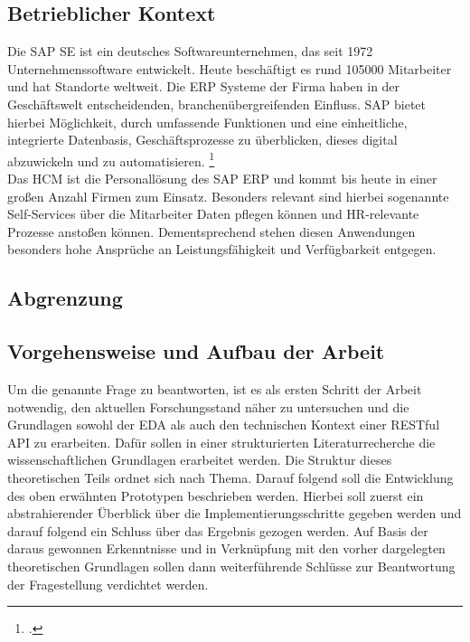 \subsection{Betrieblicher Kontext}
Die SAP SE ist ein deutsches Softwareunternehmen, das seit 1972 Unternehmenssoftware entwickelt. Heute beschäftigt es rund 105000 Mitarbeiter und hat Standorte weltweit. Die \ac{ERP} Systeme der Firma haben in der Geschäftswelt entscheidenden, branchenübergreifenden Einfluss. SAP bietet hierbei Möglichkeit, durch umfassende Funktionen und eine einheitliche, integrierte Datenbasis, Geschäftsprozesse zu überblicken, dieses digital abzuwickeln und zu automatisieren. \footcite[Vgl.][]{sapse_was} \\
Das HCM ist die Personallösung des SAP ERP und kommt bis heute in einer großen Anzahl Firmen zum Einsatz. Besonders relevant sind hierbei sogenannte Self-Services über die Mitarbeiter Daten pflegen können und HR-relevante Prozesse anstoßen können. Dementsprechend stehen diesen Anwendungen besonders hohe Ansprüche an Leistungsfähigkeit und Verfügbarkeit entgegen.

\subsection{Abgrenzung}

\subsection{Vorgehensweise und Aufbau der Arbeit}
Um die genannte Frage zu beantworten, ist es als ersten Schritt der Arbeit notwendig, den aktuellen Forschungsstand näher zu untersuchen und die Grundlagen sowohl der \ac{EDA} als auch den technischen Kontext einer RESTful API zu erarbeiten. Dafür sollen in einer strukturierten Literaturrecherche die wissenschaftlichen Grundlagen erarbeitet werden. Die Struktur dieses theoretischen Teils ordnet sich nach Thema. Darauf folgend soll die Entwicklung des oben erwähnten Prototypen beschrieben werden. Hierbei soll zuerst ein abstrahierender Überblick über die Implementierungsschritte gegeben werden und darauf folgend ein Schluss über das Ergebnis gezogen werden. Auf Basis der daraus gewonnen Erkenntnisse und in Verknüpfung mit den vorher dargelegten theoretischen Grundlagen sollen dann weiterführende Schlüsse zur Beantwortung der Fragestellung verdichtet werden.
